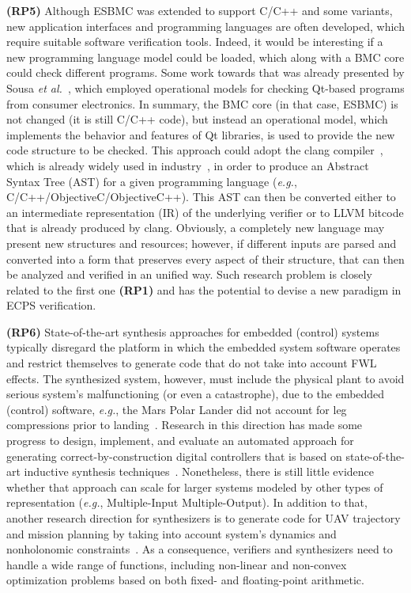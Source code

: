 \documentclass[format=acmsmall, review=false, screen=true]{acmart}
\begin{document}
{\textbf{(RP5)} Although ESBMC \cite{Cordeiro12} was extended to support C/C++ and some variants, new application interfaces and programming languages are often developed, which require suitable software verification tools. Indeed, it would be interesting if a new programming language model could be loaded, which along with a BMC core could check different programs. Some work towards that was already presented by Sousa {\it et al.}~\cite{Garcia16}, which employed operational models for checking Qt-based programs from consumer electronics. In summary, the BMC core (in that case, ESBMC) is not changed (it is still C/C++ code), but instead an operational model, which implements the behavior and features of Qt libraries, is used to provide the new code structure to be checked. This approach could adopt the clang compiler~\cite{Lopes:2014:GSL:2692607}, which is already widely used in industry~\cite{clang-usage}, in order to produce an Abstract Syntax Tree (AST) for a given programming language ({\it e.g.}, C/C++/ObjectiveC/ObjectiveC++). This AST can then be converted either to an intermediate representation (IR) of the underlying verifier or to LLVM bitcode that is already produced by clang. Obviously, a completely new language may present new structures and resources; however, if different inputs are parsed and converted into a form that preserves every aspect of their structure, that can then be analyzed and verified in an unified way. Such research problem is closely related to the first one \textbf{(RP1)} and has the potential to devise a new paradigm in ECPS verification.

{\textbf{(RP6)} State-of-the-art synthesis approaches for embedded (control) systems typically disregard the platform in which the embedded system software operates and restrict themselves to generate code that do not take into account FWL effects. The synthesized system, however, must include the physical plant to avoid serious system's malfunctioning (or even a catastrophe), due to the embedded (control) software, {\it e.g.}, the Mars Polar Lander did not account for leg compressions prior to landing~\cite{Jackson16}. Research in this direction has made some progress to design, implement, and evaluate an automated approach for generating correct-by-construction digital controllers that is based on state-of-the-art inductive synthesis techniques~\cite{Abate17,abatecav2017}. Nonetheless, there is still little evidence whether that approach can scale for larger systems modeled by other types of representation ({\it e.g.}, Multiple-Input Multiple-Output). In addition to that, another research direction for synthesizers is to generate code for UAV trajectory and mission planning by taking into account system's dynamics and nonholonomic constraints~\cite{Araujo16}. As a consequence, verifiers and synthesizers need to handle a wide range of functions, including non-linear and non-convex optimization problems based on both fixed- and floating-point arithmetic.

}}
\end{document}
